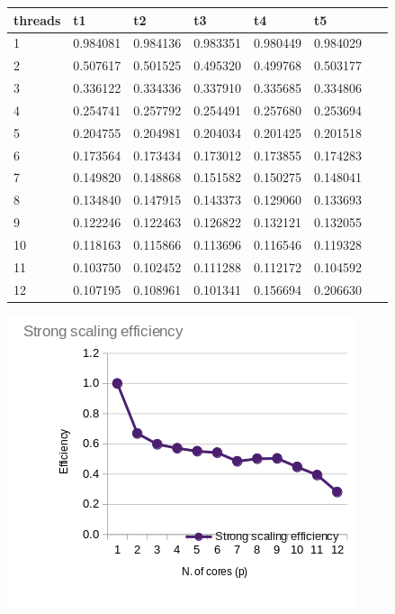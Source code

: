\documentclass[a4paper,12pt, twoside]{report}
\begin{document}
\begin{table}[!ht]
    \centering
    \begin{tabular}{|l|l|l|l|l|l|l|}
    \hline
        threads & t1 & t2 & t3 & t4 & t5 & ~ \\ \hline
        1 & 0.984081 & 0.984136 & 0.983351 & 0.980449 & 0.984029 & ~ \\ \hline
        2 & 0.507617 & 0.501525 & 0.495320 & 0.499768 & 0.503177 & ~ \\ \hline
        3 & 0.336122 & 0.334336 & 0.337910 & 0.335685 & 0.334806 & ~ \\ \hline
        4 & 0.254741 & 0.257792 & 0.254491 & 0.257680 & 0.253694 & ~ \\ \hline
        5 & 0.204755 & 0.204981 & 0.204034 & 0.201425 & 0.201518 & ~ \\ \hline
        6 & 0.173564 & 0.173434 & 0.173012 & 0.173855 & 0.174283 & ~ \\ \hline
        7 & 0.149820 & 0.148868 & 0.151582 & 0.150275 & 0.148041 & ~ \\ \hline
        8 & 0.134840 & 0.147915 & 0.143373 & 0.129060 & 0.133693 & ~ \\ \hline
        9 & 0.122246 & 0.122463 & 0.126822 & 0.132121 & 0.132055 & ~ \\ \hline
        10 & 0.118163 & 0.115866 & 0.113696 & 0.116546 & 0.119328 & ~ \\ \hline
        11 & 0.103750 & 0.102452 & 0.111288 & 0.112172 & 0.104592 & ~ \\ \hline
        12 & 0.107195 & 0.108961 & 0.101341 & 0.156694 & 0.206630 & ~ \\ \hline
    \end{tabular}
\end{table}
\newline
\includegraphics[scale=0.5]{images/omp_strong.png}
\end{document}

